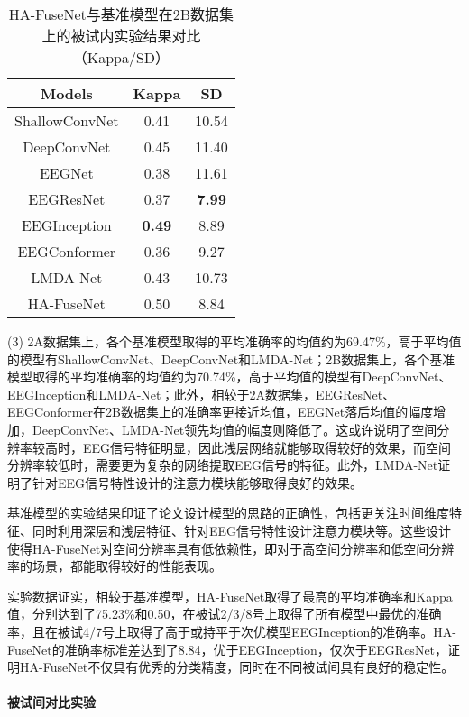 \begin{table}[H]
    \centering
    \caption{HA-FuseNet与基准模型在2B数据集上的被试内实验结果对比（Kappa/SD）}
    \label{tab:2bcompareinsd}
    \begin{tabularx}{\textwidth}{CCC}
      \toprule
      Models & Kappa & SD \\
      \midrule
      ShallowConvNet\cite{schirrmeister2017deep} &0.41&10.54\\
      DeepConvNet\cite{schirrmeister2017deep} &0.45&11.40\\
      EEGNet\cite{lawhern2018eegnet} &0.38& 11.61\\
      EEGResNet\cite{HBM:HBM23730} &0.37&\textbf{7.99}\\
      EEGInception\cite{zhang2021eeg} &\textbf{0.49}&8.89\\
      EEGConformer\cite{song2022eeg} &0.36&9.27\\
      LMDA-Net\cite{miao2023lmda} &0.43&10.73\\
      \midrule 
      HA-FuseNet &0.50&8.84\\
      \bottomrule
    \end{tabularx}
\end{table}

(3) 2A数据集上，各个基准模型取得的平均准确率的均值约为69.47\%，高于平均值的模型有ShallowConvNet、DeepConvNet和LMDA-Net；2B数据集上，各个基准模型取得的平均准确率的均值约为70.74\%，高于平均值的模型有DeepConvNet、EEGInception和LMDA-Net；此外，相较于2A数据集，EEGResNet、EEGConformer在2B数据集上的准确率更接近均值，EEGNet落后均值的幅度增加，DeepConvNet、LMDA-Net领先均值的幅度则降低了。这或许说明了空间分辨率较高时，EEG信号特征明显，因此浅层网络就能够取得较好的效果，而空间分辨率较低时，需要更为复杂的网络提取EEG信号的特征。此外，LMDA-Net证明了针对EEG信号特性设计的注意力模块能够取得良好的效果。

基准模型的实验结果印证了论文设计模型的思路的正确性，包括更关注时间维度特征、同时利用深层和浅层特征、针对EEG信号特性设计注意力模块等。这些设计使得HA-FuseNet对空间分辨率具有低依赖性，即对于高空间分辨率和低空间分辨率的场景，都能取得较好的性能表现。

实验数据证实，相较于基准模型，HA-FuseNet取得了最高的平均准确率和Kappa值，分别达到了75.23\%和0.50，在被试2/3/8号上取得了所有模型中最优的准确率，且在被试4/7号上取得了高于或持平于次优模型EEGInception的准确率。HA-FuseNet的准确率标准差达到了8.84，优于EEGInception，仅次于EEGResNet，证明HA-FuseNet不仅具有优秀的分类精度，同时在不同被试间具有良好的稳定性。

\paragraph{被试间对比实验}

